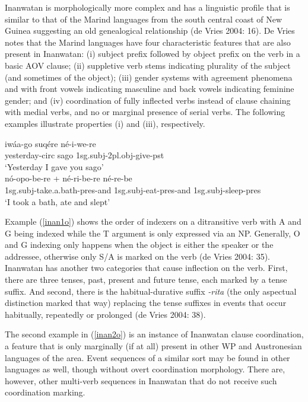 Inanwatan is morphologically more complex and has a linguistic profile that is similar to that of the Marind languages from the south central coast of New Guinea suggesting an old genealogical relationship (de Vries  2004: 16). De Vries notes that the Marind languages have four characteristic features that are also present in Inanwatan: (i) subject prefix followed by object prefix on the verb in a basic AOV clause; (ii) suppletive verb stems indicating plurality of the subject (and sometimes of the object); (iii) gender systems with agreement phenomena and with front vowels indicating masculine and back vowels indicating feminine gender; and (iv) coordination of fully inflected verbs instead of clause chaining with medial verbs, and no or marginal presence of serial verbs. The following examples illustrate properties (i) and (iii), respectively.

\pex 
\a \label{inan1o}
\gll iwáa-go suqére né-i-we-re \\
yesterday-\acs{circ} sago \acs{1}\acs{sg}.\acs{subj}-\acs{2}\acs{pl}.\acs{obj}-give-\acs{pst} \\
\glft `Yesterday I gave you sago' \\ 
\z
\a \label{inan2o}
\gla nó-opo-be-re + né-ri-be-re né-re-be \\ 
\acs{1}\acs{sg}.\acs{subj}-take.a.bath-\acs{pres}-and \acs{1}\acs{sg}.\acs{subj}-eat-\acs{pres}-and \acs{1}\acs{sg}.\acs{subj}-sleep-\acs{pres} \\
\glft `I took a bath, ate and slept' \\ 
\z
\xe

Example (\ref{inan1o}) shows the order of indexers on a ditransitive verb with A and G being indexed while the T argument is only expressed via an NP. Generally, O and G indexing only happens when the object is either the speaker or the addressee, otherwise only S/A is marked on the verb (de Vries 2004: 35). Inanwatan has another two categories that cause inflection on the verb. First, there are three tenses, past, present and future tense, each marked by a tense suffix. And second, there is the habitual-durative suffix \textit{-rita} (the only aspectual distinction marked that way) replacing the tense suffixes in events that occur habitually, repeatedly or prolonged (de Vries 2004: 38).

The second example in (\ref{inan2o}) is an instance of Inanwatan clause coordination, a feature that is only marginally (if at all) present in other WP and Austronesian languages of the area. Event sequences of a similar sort may be found in other languages as well, though without overt coordination morphology. There are, however, other multi-verb sequences in Inanwatan that do not receive such coordination marking.

